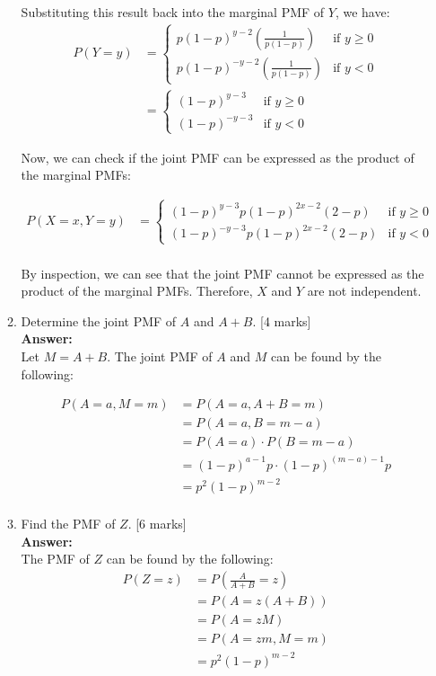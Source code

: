 \documentclass[12pt]{article}
\begin{document}
\begin{enumerate}
\begin{enumerate}
Substituting this result back into the marginal PMF of $Y$, we have:
\begin{align*}
P(Y=y) &= \begin{cases}
p(1-p)^{y-2} \left(\frac{1}{p(1-p)}\right) & \text{if } y \geq 0 \\
p(1-p)^{-y-2} \left(\frac{1}{p(1-p)}\right) & \text{if } y < 0
\end{cases} \\
&= \begin{cases}
(1-p)^{y-3} & \text{if } y \geq 0 \\
(1-p)^{-y-3} & \text{if } y < 0
\end{cases}
\end{align*}

Now, we can check if the joint PMF can be expressed as the product of the marginal PMFs:

\begin{align*}
P(X=x, Y=y) &= \begin{cases}
(1-p)^{y-3}p(1-p)^{2x-2} \left( 2-p \right) & \text{if } y \geq 0 \\
(1-p)^{-y-3}p(1-p)^{2x-2} \left( 2-p \right) & \text{if } y < 0
\end{cases} \\
\end{align*}

By inspection, we can see that the joint PMF cannot be expressed as the product of the marginal PMFs. Therefore, $X$ and $Y$ are not independent.
%

\item Determine the joint PMF of $A$ and $A+B$. 
			\hfill [4 marks]
%
\\
\textbf{Answer:}
\\
Let $M = A + B$. The joint PMF of $A$ and $M$ can be found by the following:

\begin{align*}
P(A=a, M=m) &= P(A=a, A+B=m) \\
&= P(A=a, B=m-a) \\
&= P(A=a) \cdot P(B=m-a) \\
&= (1-p)^{a-1}p \cdot (1-p)^{(m-a)-1}p \\
&= p^2(1-p)^{m-2} \\
\end{align*}
%

\item Find the PMF of $Z$.  
			\hfill [6 marks]
%
\\
\textbf{Answer:}
\\
The PMF of $Z$ can be found by the following:
\begin{align*}
P(Z=z) &= P\left(\frac{A}{A+B} = z\right) \\
&= P(A = z(A+B)) \\
&= P(A = zM) \\
&= P(A = zm, M=m) \\
&= \boxed{p^2(1-p)^{m-2}} \\
\end{align*}
%



\end{enumerate}
\end{enumerate}
\end{document}
